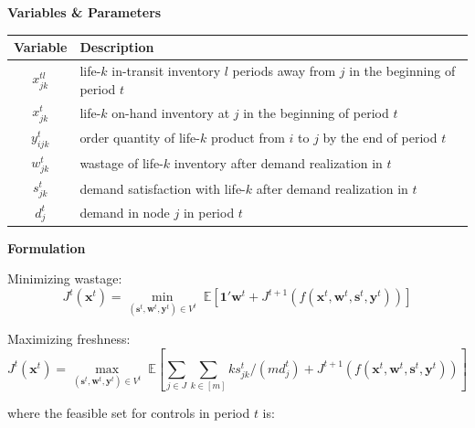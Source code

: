\documentclass{article}
\newcommand{\ra}[1]{
\renewcommand{\arraystretch}{#1}}
\newcommand{\pa}[1]{\noindent\textbf{\textsf{#1}}}
\newcommand{\x}{\mathbf{x}}
\newcommand{\y}{\mathbf{y}}
\newcommand{\w}{\mathbf{w}}
\newcommand{\s}{\mathbf{s}}
\begin{document}
\pa{Variables \& Parameters}

\begin{table}[ht]
\centering
\ra{1.3}
\begin{tabular}{@{}cl@{}}
\toprule
Variable & Description \\
\midrule
$x_{jk}^{tl}$ & life-$k$ in-transit inventory $l$ periods away from $j$ in the beginning of period $t$ \\
$x_{jk}^{t}$ & life-$k$ on-hand inventory at $j$ in the beginning of period $t$ \\
$y_{ijk}^t$ & order quantity of life-$k$ product from $i$ to $j$ by the end of period $t$ \\
$w_{jk}^t$ & wastage of life-$k$ inventory after demand realization in $t$ \\ 
$s_{jk}^t$ & demand satisfaction with life-$k$ after demand realization in $t$ \\
$d_j^t$ & demand in node $j$ in period $t$ \\
\bottomrule
\end{tabular}
\end{table}

\pa{Formulation}
\newline

Minimizing wastage: $$J^t(\x^t) = \min_{(\s^t,\w^t,\y^t) \in V^t}  \; \mathbb{E} \left[\mathbf{1}' \w^t + J^{t+1}(f(\x^t, \w^t, \s^t, \y^t)) \right] $$

Maximizing freshness: $$J^t(\x^t) = \max_{(\s^t,\w^t,\y^t) \in V^t} \; \mathbb{E} \left[\sum_{j \in J} \sum_{k \in [m]} k s_{jk}^t / (md_j^t) + J^{t+1}(f(\x^t, \w^t, \s^t, \y^t))\right]$$


where the feasible set for controls in period $t$ is:
\end{document}
